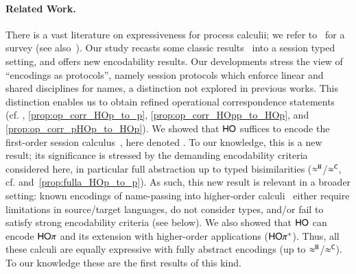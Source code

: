 \documentclass[runningheads]{llncs}
\begin{document}
{\paragraph{Related Work.}
There is a vast literature on expressiveness for process calculii; we refer to~\cite{DBLP:journals/entcs/Parrow08} 
for a survey (see also~\cite[\S\,2.3]{PerezPhD10}).
Our study  recasts some classic results~\cite{SangiorgiD:expmpa} into a session typed setting, and
offers new encodability results.
Our developments stress the 
view of ``encodings as protocols'', namely session protocols which
enforce linear and shared disciplines for names, a distinction
not explored in %
previous works.
This distinction %
enables us to obtain 
 refined 
operational correspondence statements (cf. , \ref{prop:op_corr_HOp_to_p}, \ref{prop:op_corr_HOpp_to_HOp}, and \ref{prop:op_corr_pHOp_to_HOp}).
We showed that
$\mathsf{HO}$ suffices to encode   the first-order session
calculus~\cite{honda.vasconcelos.kubo:language-primitives}, here denoted \sessp. %
To our knowledge, this is a new result; %
its significance is stressed by the demanding encodability criteria  considered here, in particular full abstraction up to typed bisimilarities
($\approx^\mathtt{H}$/$\approx^\mathtt{C}$, cf.  and~\ref{prop:fulla_HOp_to_p}).
As such, this new result is relevant in a broader setting: known encodings 
of name-passing into higher-order calculi~\cite{SaWabook,BundgaardHG06,DBLP:journals/entcs/MeredithR05,XuActa2012,DBLP:journals/corr/XuYL15} either require limitations
in source/target languages,
do not consider types,
 and/or fail to satisfy strong encodability criteria (see below). 
We also showed that $\mathsf{HO}$ can encode $\mathsf{HO}\pi$ and its extension with
higher-order applications ($\mathsf{HO\pi^{+}}$). 
Thus, %
all these  calculi are equally expressive with fully
abstract encodings (up to $\approx^\mathtt{H}$/$\approx^\mathtt{C}$).  
To our knowledge these are the first results of this kind.

}
\end{document}
